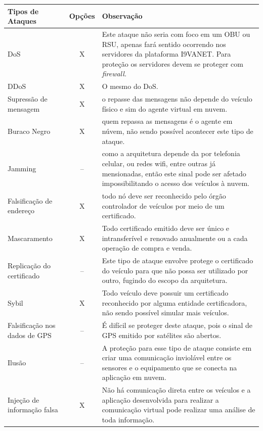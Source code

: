 \documentclass[
	12pt,				%
	oneside,			%
	a4paper,			%
	english,			%
	brazil				%
	]{abntex2ppgsi}
\begin{document}
\begin{longtable}{|l|c| p{}|} 
	\hline
		\hline
		\rowcolor[gray]{0.7}
		Tipos de Ataques & Opções & Observação \\ \hline
		DoS	&  X & Este ataque não seria com foco em um OBU ou RSU, apenas fará sentido ocorrendo nos servidores da plataforma I9VANET. Para proteção os servidores devem se proteger com \textit{firewall.}   \\ \hline
		DDoS & X & O mesmo do DoS. \\ \hline
		Supressão de mensagem	&  X &  o repasse das mensagens não depende do veículo físico e sim do agente virtual em nuvem.\\ \hline
		Buraco Negro	& X  & quem repassa as mensagens é o agente em núvem, não sendo possível acontecer este tipo de ataque. \\ \hline
		Jamming	&  -- & como a arquitetura depende da por telefonia celular, ou redes wifi, entre outras já mensionadas, então este sinal pode ser afetado impossibilitando o acesso dos veículos à nuvem. \\ \hline
		Falsificação de endereço	&  X & todo nó deve ser reconhecido pelo órgão controlador de veículos por meio de um certificado. \\ \hline
		Mascaramento	&  X & Todo certificado emitido deve ser único e intransferível e renovado anualmente ou a cada operação de compra e venda. \\ \hline
		Replicação do certificado	&  -- & Este tipo de ataque envolve protege o certificado do veículo para que não possa ser utilizado por outro, fugindo do escopo da arquitetura.\\ \hline
		Sybil	&  X & Todo veículo deve possuir um certificado reconhecido por alguma entidade certificadora, não sendo possível simular mais veículos.\\ \hline
		Falsificação nos dados de GPS &  -- & É difícil se proteger deste ataque, pois o sinal de GPS emitido por satélites são abertos.\\ \hline
		Ilusão	&  -- & A proteção para esse tipo de ataque consiste em criar uma comunicação inviolável entre os sensores e o equipamento que se conecta na aplicação em nuvem. \\ \hline
		Injeção de informação falsa	&  X & Não há comunicação direta entre os veículos e a aplicação desenvolvida para realizar a comunicação virtual pode realizar uma análise de toda informação. \\ \hline

\end{longtable}
\end{document}

